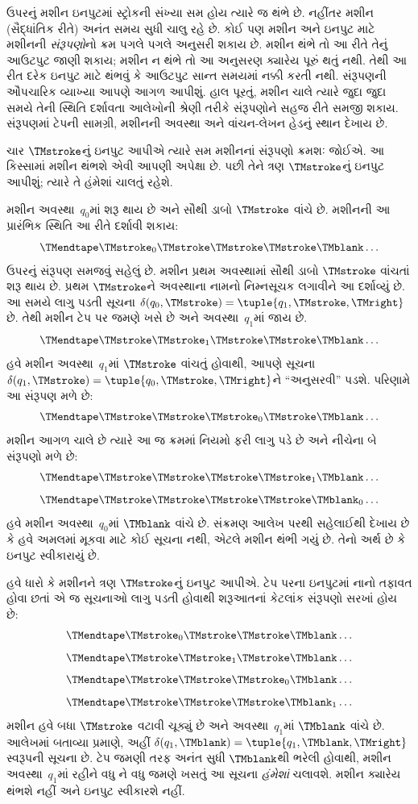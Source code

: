 \begin{explain}
ઉપરનું મશીન ઇનપુટમાં સ્ટ્રોકની સંખ્યા સમ હોય ત્યારે
જ થંભે છે. નહીંતર મશીન (સૈદ્ધાંતિક રીતે) અનંત સમય સુધી
ચાલુ રહે છે. કોઈ પણ મશીન અને ઇનપુટ માટે મશીનની
\emph{સંરૂપણો}નો ક્રમ પગલે પગલે અનુસરી શકાય છે. મશીન
થંભે તો આ રીતે તેનું આઉટપુટ જાણી શકાય; મશીન ન થંભે
તો આ અનુસરણ ક્યારેય પૂરું થતું નથી. તેથી આ રીત દરેક
ઇનપુટ માટે થંભવું કે આઉટપુટ સાન્ત સમયમાં નક્કી કરતી નથી.
સંરૂપણની ઔપચારિક વ્યાખ્યા આપણે આગળ આપીશું. હાલ પૂરતું,
મશીન ચાલે ત્યારે જુદા જુદા સમયે તેની સ્થિતિ દર્શાવતા આલેખોની
શ્રેણી તરીકે સંરૂપણોને સહજ રીતે સમજી શકાય. સંરૂપણમાં ટેપની
સામગ્રી, મશીનની અવસ્થા અને વાંચન-લેખન હેડનું સ્થાન દેખાય છે.

ચાર $\TMstroke$નું ઇનપુટ આપીએ ત્યારે સમ મશીનનાં સંરૂપણો
ક્રમશઃ જોઈએ. આ કિસ્સામાં મશીન થંભશે એવી આપણી અપેક્ષા
છે. પછી તેને ત્રણ $\TMstroke$નું ઇનપુટ આપીશું; ત્યારે તે
હંમેશાં ચાલતું રહેશે.

મશીન અવસ્થા~$q_0$માં શરૂ થાય છે અને સૌથી ડાબો
$\TMstroke$ વાંચે છે. મશીનની આ પ્રારંભિક સ્થિતિ આ રીતે
દર્શાવી શકાય:
\[
\TMendtape \TMstroke_0 \TMstroke \TMstroke \TMstroke \TMblank \ldots
\]
ઉપરનું સંરૂપણ સમજવું સહેલું છે. મશીન પ્રથમ અવસ્થામાં
સૌથી ડાબો $\TMstroke$ વાંચતાં શરૂ થાય છે. પ્રથમ
$\TMstroke$ને અવસ્થાના નામનો નિમ્નસૂચક લગાવીને આ દર્શાવ્યું
છે. આ સમયે લાગુ પડતી સૂચના
$\delta(q_0, \TMstroke) = \tuple{q_1, \TMstroke, \TMright}$
છે. તેથી મશીન ટેપ પર જમણે ખસે છે અને અવસ્થા~$q_1$માં
જાય છે.
\[
\TMendtape \TMstroke \TMstroke_1 \TMstroke \TMstroke \TMblank \ldots
\]
હવે મશીન અવસ્થા~$q_1$માં $\TMstroke$ વાંચતું હોવાથી,
આપણે સૂચના $\delta(q_1, \TMstroke) = \tuple{q_0,
  \TMstroke, \TMright}$ને ``અનુસરવી'' પડશે. પરિણામે આ
સંરૂપણ મળે છે:
\[
\TMendtape \TMstroke \TMstroke \TMstroke_0 \TMstroke \TMblank \ldots
\]
મશીન આગળ ચાલે છે ત્યારે આ જ ક્રમમાં નિયમો ફરી લાગુ પડે
છે અને નીચેના બે સંરૂપણો મળે છે:
\[
\TMendtape \TMstroke \TMstroke \TMstroke \TMstroke_1 \TMblank \ldots
\]
\[
\TMendtape \TMstroke \TMstroke \TMstroke \TMstroke \TMblank_0 \ldots
\]
હવે મશીન અવસ્થા~$q_0$માં $\TMblank$ વાંચે છે. સંક્રમણ
આલેખ પરથી સહેલાઈથી દેખાય છે કે હવે અમલમાં મૂકવા માટે કોઈ
સૂચના નથી, એટલે મશીન થંભી ગયું છે. તેનો અર્થ છે કે
ઇનપુટ સ્વીકારાયું છે.

હવે ધારો કે મશીનને ત્રણ $\TMstroke$નું ઇનપુટ આપીએ.
ટેપ પરના ઇનપુટમાં નાનો તફાવત હોવા છતાં એ જ સૂચનાઓ લાગુ
પડતી હોવાથી શરૂઆતનાં કેટલાંક સંરૂપણો સરખાં હોય છે:
\[
\TMendtape \TMstroke_0 \TMstroke \TMstroke \TMblank \ldots
\]
\[
\TMendtape \TMstroke \TMstroke_1 \TMstroke \TMblank \ldots
\]
\[
\TMendtape \TMstroke \TMstroke \TMstroke_0 \TMblank \ldots
\]
\[
\TMendtape \TMstroke \TMstroke \TMstroke \TMblank_1 \ldots
\]
મશીન હવે બધા $\TMstroke$ વટાવી ચૂક્યું છે અને
અવસ્થા~$q_1$માં $\TMblank$ વાંચે છે. આલેખમાં બતાવ્યા
પ્રમાણે, અહીં $\delta(q_1, \TMblank) =\tuple{q_1,
\TMblank, \TMright}$ સ્વરૂપની સૂચના છે. ટેપ જમણી તરફ
અનંત સુધી $\TMblank$થી ભરેલી હોવાથી, મશીન
અવસ્થા~$q_1$માં રહીને વધુ ને વધુ જમણે ખસતું આ સૂચના
\emph{હંમેશાં} ચલાવશે. મશીન ક્યારેય થંભશે નહીં અને ઇનપુટ
સ્વીકારશે નહીં.
\end{explain}


